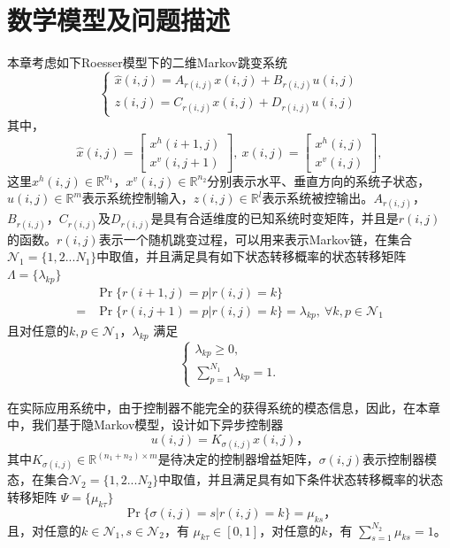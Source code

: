 \section{数学模型及问题描述}
	本章考虑如下Roesser模型下的二维Markov跳变系统
	\begin{equation} \label{qc-system-equation}
	\left\{
	\begin{array}{lr}
	\hat{x}(i,j) = A_{r(i,j)}x(i,j)+B_{r(i,j)}u(i,j) \\
	z(i,j) = C_{r(i,j)}x(i,j)+D_{r(i,j)}u(i,j)
	\end{array}
	\right.
	\end{equation}
	其中，
	\begin{equation*}
	\hat{x}(i,j) = \begin{bmatrix}
	x^{h}(i+1,j) \\
	x^{v}(i,j+1)
	\end{bmatrix}, \
	x(i, j) = \begin{bmatrix}
	x^{h}(i,j) \\
	x^{v}(i,j)
	\end{bmatrix},
	\end{equation*}
	这里$x^{h}(i,j)\in\mathbb{R}^{n_1}$，$x^{v}(i,j)\in\mathbb{R}^{n_2}$分别表示水平、垂直方向的系统子状态，$u(i,j)\in\mathbb{R}^{m}$表示系统控制输入，$z(i,j)\in\mathbb{R}^{l}$表示系统被控输出。$A_{r(i,j)}$，$B_{r(i,j)}$，$C_{r(i,j)}$及$D_{r(i,j)}$是具有合适维度的已知系统时变矩阵，并且是$r(i,j)$的函数。$r(i,j)$表示一个随机跳变过程，可以用来表示Markov链，在集合$\mathcal{N}_{1} = \{1,2...N_{1}\}$中取值，并且满足具有如下状态转移概率的状态转移矩阵$\varLambda = \{\lambda_{kp}\}$
	\begin{equation}\label{qc-tps-system}
	\begin{split}
	&\Pr\{r(i+1,j)=p|r(i,j)=k\}\\
	=&\Pr\{r(i,j+1)=p|r(i,j)=k\}=\lambda_{kp},\  \forall k,p \in \mathcal{N}_{1}
	\end{split}
	\end{equation}
	且对任意的$k, p\in\mathcal{N}_{1}$，$\lambda_{kp}$ 满足
	\begin{equation}
	\left\{
	\begin{array}{lr}
	\lambda_{kp} \geq 0, \\
	\sum_{p=1}^{N_1}\lambda_{kp}=1.
	\end{array}
	\right.
	\end{equation}
	
	在实际应用系统中，由于控制器不能完全的获得系统的模态信息，因此，在本章中，我们基于隐Markov模型，设计如下异步控制器
	\begin{equation}\label{qc-controller}
	u(i,j) = K_{\sigma(i,j)}x(i,j)，
	\end{equation}
	其中$K_{\sigma(i,j)}\in \mathbb{R}^{(n_1+n_2)\times m}$是待决定的控制器增益矩阵，$\sigma(i,j)$表示控制器模态，在集合$\mathcal{N}_{2} = \{1,2...N_{2}\}$中取值，并且满足具有如下条件状态转移概率的状态转移矩阵 $\varPsi=\{\mu_{k\tau }\}$
	\begin{equation}
	\Pr\{\sigma(i,j)=s|r(i,j)=k\}=\mu_{ks }， %
	\end{equation}
	且，对任意的$k\in\mathcal{N}_{1}, s\in\mathcal{N}_{2}$，有 $\mu_{k\tau }\in[0,1]$，对任意的$k$，有  $\sum_{s =1}^{N_{2}}\mu_{ks } = 1$。
	

